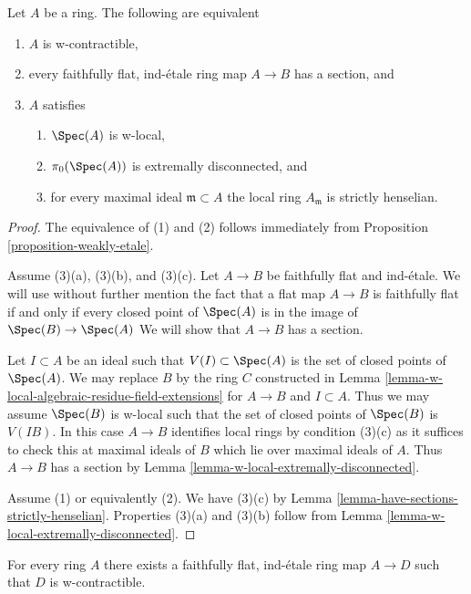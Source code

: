 \begin{lemma}
\label{lemma-w-local-stricly-henselian-extremally-disconnected}
Let $A$ be a ring. The following are equivalent
\begin{enumerate}
\item $A$ is w-contractible,
\item every faithfully flat, ind-\'etale ring map $A \to B$ has
a section, and
\item $A$ satisfies
\begin{enumerate}
\item $\Spec(A)$ is w-local,
\item $\pi_0(\Spec(A))$ is extremally disconnected, and
\item for every maximal ideal $\mathfrak m \subset A$ the
local ring $A_\mathfrak m$ is strictly henselian.
\end{enumerate}
\end{enumerate}
\end{lemma}

\begin{proof}
The equivalence of (1) and (2) follows immediately from
Proposition \ref{proposition-weakly-etale}.

\medskip\noindent
Assume (3)(a), (3)(b), and (3)(c). Let $A \to B$ be faithfully flat
and ind-\'etale. We will use without further mention the fact that a flat map
$A \to B$ is faithfully flat if and only if every closed point
of $\Spec(A)$ is in the image of $\Spec(B) \to \Spec(A)$
We will show that $A \to B$ has a section.

\medskip\noindent
Let $I \subset A$ be an ideal such that $V(I) \subset \Spec(A)$ is
the set of closed points of $\Spec(A)$. 
We may replace $B$ by the ring $C$ constructed in
Lemma \ref{lemma-w-local-algebraic-residue-field-extensions}
for $A \to B$ and $I \subset A$.
Thus we may assume $\Spec(B)$ is w-local such that the set of
closed points of $\Spec(B)$ is $V(IB)$. In this case $A \to B$
identifies local rings by condition (3)(c) as it suffices to check
this at maximal ideals of $B$ which lie over maximal ideals of $A$.
Thus $A \to B$ has a section by
Lemma \ref{lemma-w-local-extremally-disconnected}.

\medskip\noindent
Assume (1) or equivalently (2). We have (3)(c) by
Lemma \ref{lemma-have-sections-strictly-henselian}.
Properties (3)(a) and (3)(b) follow from
Lemma \ref{lemma-w-local-extremally-disconnected}.
\end{proof}

\begin{proposition}
\label{proposition-find-w-contractible}
For every ring $A$ there exists a faithfully flat, ind-\'etale ring
map $A \to D$ such that $D$ is w-contractible.
\end{proposition}

